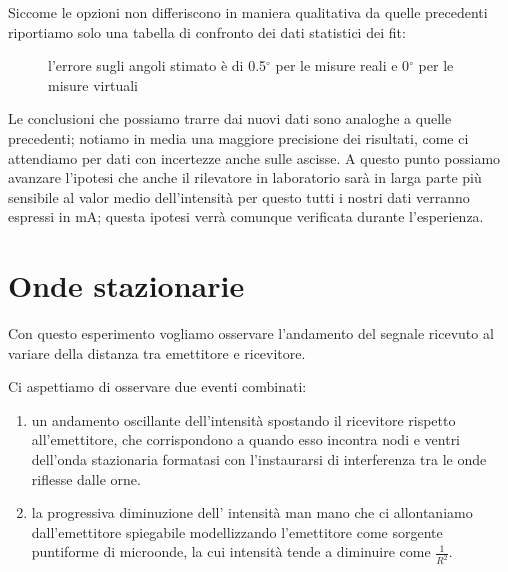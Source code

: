 \documentclass{article}
\theoremstyle{definition}
\begin{document}
Siccome le opzioni non differiscono in maniera qualitativa da quelle precedenti riportiamo solo una tabella di confronto dei dati statistici dei fit:
  \begin{figure}[!htbp]
    	\captionsetup{labelformat=empty}
\caption{l'errore sugli angoli stimato è di 0.5\(^{\circ}\) per le misure reali e 0\(^{\circ}\) per le misure virtuali}
\end{figure}
 

Le conclusioni che possiamo trarre dai nuovi dati sono analoghe a quelle precedenti; notiamo in media una maggiore precisione dei risultati, come ci attendiamo per dati con incertezze anche sulle ascisse. A questo punto possiamo avanzare l'ipotesi che anche il rilevatore in laboratorio sarà in larga parte più sensibile al valor medio dell'intensità per questo tutti i nostri dati verranno espressi in mA; questa ipotesi verrà comunque verificata durante l'esperienza.\\


\section{Onde stazionarie}

Con questo esperimento vogliamo osservare l'andamento del segnale ricevuto al variare della distanza tra emettitore e ricevitore.

\noindent Ci aspettiamo di osservare due eventi combinati:
\begin{enumerate}
   \item un andamento oscillante dell'intensità spostando il ricevitore rispetto all'emettitore, che corrispondono a quando esso incontra nodi e ventri dell'onda stazionaria formatasi con l'instaurarsi di interferenza tra le onde riflesse dalle orne.
    
   \item la progressiva diminuzione dell' intensità man mano che ci allontaniamo dall'emettitore spiegabile modellizzando l'emettitore come sorgente puntiforme di microonde, la cui intensità tende a diminuire come \(\frac{1}{R^{2}}\).
\end{enumerate}
\end{document}
